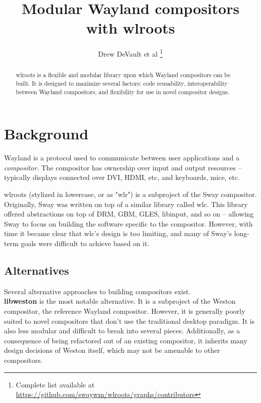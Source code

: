 \documentclass{article}
\begin{document}
\title{Modular Wayland compositors with wlroots}
\author{Drew DeVault et al
    \thanks{Complete list available at \url{https://github.com/swaywm/wlroots/graphs/contributors}}}
\maketitle

\begin{abstract}
wlroots is a flexible and modular library upon which Wayland compositors can be
built. It is designed to maximize several factors: code reusability,
interoperability between Wayland compositors, and flexibility for use in novel
compositor designs.
\end{abstract}

\newpage
\tableofcontents

\newpage
\section{Background}\label{background}

Wayland is a protocol used to communicate between user applications and a
\emph{compositor}. The compositor has ownership over input and output
resources -- typically displays connected over DVI, HDMI, etc, and keyboards,
mice, etc.

wlroots (stylized in lowercase, or as "wlr") is a subproject of the Sway
compositor. Originally, Sway was written on top of a similar library called wlc.
This library offered abstractions on top of DRM, GBM, GLES, libinput, and so on
-- allowing Sway to focus on building the software specific to the compositor.
However, with time it became clear that wlc's design is too limiting, and many
of Sway's long-term goals were difficult to achieve based on it.

\subsection{Alternatives}\label{alternatives}

Several alternative approaches to building compositors exist.\\

\textbf{libweston} is the most notable alternative. It is a subproject of the
Weston compositor, the reference Wayland compositor. However, it is generally
poorly suited to novel compositors that don't use the traditional desktop
paradigm. It is also less modular and difficult to break into several pieces.
Additionally, as a consequence of being refactored out of an existing
compositor, it inherits many design decisions of Weston itself, which may not be
amenable to other compositors.
\end{document}
